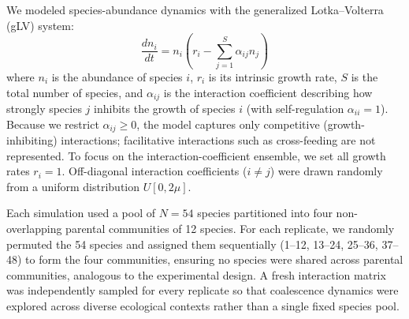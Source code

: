 We modeled species-abundance dynamics with the generalized Lotka--Volterra (gLV) system:
\begin{equation}
\frac{dn_i}{dt} = n_i \left( r_i - \sum_{j=1}^{S} \alpha_{ij} n_j \right)
\label{eq:glv}
\end{equation}
where $n_i$ is the abundance of species $i$, $r_i$ is its intrinsic growth rate, $S$ is the total number of species, and $\alpha_{ij}$ is the interaction coefficient describing how strongly species $j$ inhibits the growth of species $i$ (with self-regulation $\alpha_{ii} = 1$).  Because we restrict $\alpha_{ij} \geq 0$, the model captures only competitive (growth-inhibiting) interactions; facilitative interactions such as cross-feeding are not represented. To focus on the interaction-coefficient ensemble, we set all growth rates $r_i = 1$. Off-diagonal interaction coefficients ($i \neq j$) were drawn randomly from a uniform distribution $U[0, 2\mu]$.  

Each simulation used a pool of $N = 54$ species partitioned into four non-overlapping parental communities of 12 species. For each replicate, we randomly permuted the 54 species and assigned them sequentially (1--12, 13--24, 25--36, 37--48) to form the four communities, ensuring no species were shared across parental communities, analogous to the experimental design. A fresh interaction matrix was independently sampled for every replicate so that coalescence dynamics were explored across diverse ecological contexts rather than a single fixed species pool.

